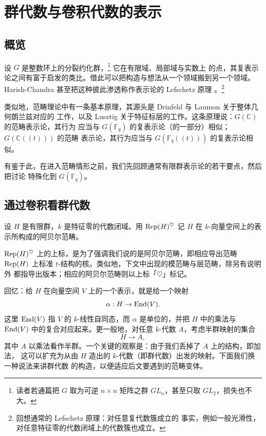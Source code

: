 
\section{群代数与卷积代数的表示}
\label{s:repthryfingroup}
\subsection{概览}

\ssszh 设 $G$ 是整数环上的分裂约化群，\footnote{读者若通篇把 $G$ 取为可逆
$n \times n$ 矩阵之群 $GL_n$，甚至只取 $GL_2$，损失也不大。} 它在有限域、局部域与实数上
的点，其复表示论之间有富于启发的类比。借此可以把构造与想法从一个领域搬到另一个领域。
Harish-Chandra 甚至把这种彼此渗透称作表示论的 Lefschetz 原理
\cite{langlands1985harish}。\footnote{回想通常的 Lefschetz 原理：对任意复代数簇成立的
事实，例如一般光滑性，对任意特征零的代数闭域上的代数簇也成立。}

类似地，范畴理论中有一条基本原理，其源头是 Drinfeld 与 Laumon 关于整体几何朗兰兹对应的
工作，以及 Lusztig 关于特征标层的工作。这条原理说：$G(\mathbb{C})$ 的范畴表示论，其行为
应当与 $G(\mathbb{F}_q)$ 的复表示论（的一部分）相似；$G(\mathbb{C}(\!(t)\!))$ 的范畴
表示论，其行为应当与 $G(\mathbb{F}_q(\!(t)\!))$ 的复表示论相似。

\ssszh 有鉴于此，在进入范畴情形之前，我们先回顾通常有限群表示论的若干要点，然后把讨论
特殊化到 $G(\mathbb{F}_q)$。

\subsection{通过卷积看群代数}

\ssszh 设 $H$ 是有限群，$k$ 是特征零的代数闭域。用 $\operatorname{Rep}(H)^\heartsuit$ 记 $H$ 在
$k$-向量空间上的表示所构成的阿贝尔范畴。

\begin{re}
$\operatorname{Rep}(H)^\heartsuit$ 上的上标，是为了强调我们说的是阿贝尔范畴，即相应导出范畴
$\operatorname{Rep}(H)$ 上标准 $t$-结构的核。类似地，下文中出现的模范畴与层范畴，除另有说明外
都指导出版本；相应的阿贝尔范畴则以上标「$\heartsuit$」标记。
\end{re}

\ssszh 回忆：给 $H$ 在向量空间 $V$ 上的一个表示，就是给一个映射
%
\begin{equation} \label{e:hom}
\alpha: H \rightarrow \operatorname{End}(V).
\end{equation}
%
这里 $\operatorname{End}(V)$ 指 $V$ 的 $k$-线性自同态，而 $\alpha$ 是单位的，并把 $H$ 中的乘法与
$\operatorname{End}(V)$ 中的复合对应起来。更一般地，对任意 $k$-代数 $A$，考虑半群映射的集合
%
\begin{equation}  \label{e:homalg}
H \rightarrow A,
\end{equation}
%
其中 $A$ 以乘法看作半群。一个关键的观察是：由于我们丢掉了 $A$ 上的结构，即加法，
这可以扩充为从由 $H$ 造出的 $k$-代数（即群代数）出发的映射。下面我们换一种说法来讲群代数
的构造，以便适应后文要遇到的范畴变体。

